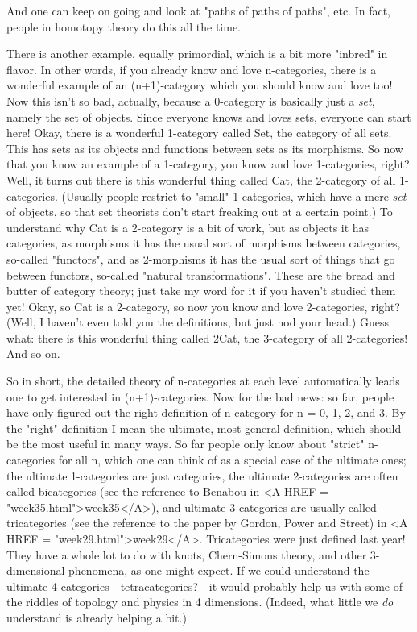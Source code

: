 And one can keep on going and look at "paths of paths of paths", etc.
In fact, people in homotopy theory do this all the time.  

There is another example, equally primordial, which is a bit more
"inbred" in flavor.  In other words, if you already know and love
n-categories, there is a wonderful example of an (n+1)-category which
you should know and love too!  Now this isn't so bad, actually,
because a 0-category is basically just a \emph{set}, namely the set of
objects.  Since everyone knows and loves sets, everyone can start
here!  Okay, there is a wonderful 1-category called Set, the category
of all sets.  This has sets as its objects and functions between sets
as its morphisms.  So now that you know an example of a 1-category,
you know and love 1-categories, right?  Well, it turns out there is
this wonderful thing called Cat, the 2-category of all 1-categories.
(Usually people restrict to "small" 1-categories, which have a mere
\emph{set} of objects, so that set theorists don't start freaking out at a
certain point.)  To understand why Cat is a 2-category is a bit of
work, but as objects it has categories, as morphisms it has the usual
sort of morphisms between categories, so-called "functors", and as
2-morphisms it has the usual sort of things that go between functors,
so-called "natural transformations".  These are the bread and butter
of category theory; just take my word for it if you haven't studied
them yet!  Okay, so Cat is a 2-category, so now you know and love
2-categories, right?  (Well, I haven't even told you the definitions,
but just nod your head.)  Guess what: there is this wonderful thing
called 2Cat, the 3-category of all 2-categories!  And so on.

So in short, the detailed theory of n-categories at each level
automatically leads one to get interested in (n+1)-categories.  Now
for the bad news: so far, people have only figured out the right
definition of n-category for n = 0, 1, 2, and 3.  By the "right"
definition I mean the ultimate, most general definition, which should
be the most useful in many ways.  So far people only know about
"strict" n-categories for all n, which one can think of as a special
case of the ultimate ones; the ultimate 1-categories are just
categories, the ultimate 2-categories are often called bicategories
(see the reference to Benabou in <A HREF = "week35.html">week35</A>), and ultimate 3-categories
are usually called tricategories (see the reference to the paper by
Gordon, Power and Street) in <A HREF = "week29.html">week29</A>.  Tricategories were just defined
last year!  They have a whole lot to do with knots, Chern-Simons
theory, and other 3-dimensional phenomena, as one might expect.  If we
could understand the ultimate 4-categories - tetracategories? - it
would probably help us with some of the riddles of topology and
physics in 4 dimensions.  (Indeed, what little we \emph{do} understand
is already helping a bit.)  

